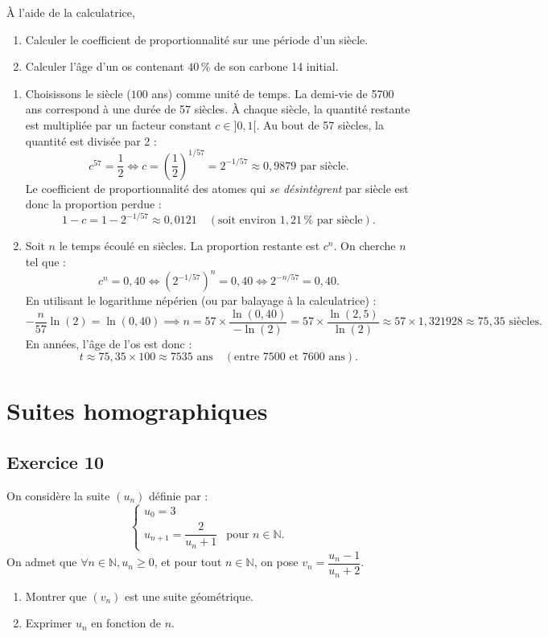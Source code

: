 \documentclass[11pt,a4paper]{article}
\newcommand{\N}{\mathbb{N}}
\begin{document}
À l'aide de la calculatrice,
\begin{enumerate}
    \item Calculer le coefficient de proportionnalité sur une période d'un siècle.
    \item Calculer l'âge d'un os contenant $40\,\%$ de son carbone 14 initial.
\end{enumerate}

\begin{correctionbox}
\begin{enumerate}
    \item Choisissons le siècle ($100$ ans) comme unité de temps. La demi-vie de 5700 ans correspond à une durée de 57 siècles.
    À chaque siècle, la quantité restante est multipliée par un facteur constant $c \in ]0, 1[$. Au bout de 57 siècles, la quantité est divisée par 2 :
    \[
    c^{57} = \frac{1}{2} \iff c = \left(\frac{1}{2}\right)^{1/57} = 2^{-1/57} \approx 0{,}9879 \text{ par siècle}.
    \]
    Le coefficient de proportionnalité des atomes qui \emph{se désintègrent} par siècle est donc la proportion perdue :
    \[
    1 - c = 1 - 2^{-1/57} \approx 0{,}0121 \quad (\text{soit environ } 1{,}21\,\% \text{ par siècle}).
    \]
    \item Soit $n$ le temps écoulé en siècles. La proportion restante est $c^n$. On cherche $n$ tel que :
    \[
    c^n = 0{,}40 \iff \left(2^{-1/57}\right)^n = 0{,}40 \iff 2^{-n/57} = 0{,}40.
    \]
    En utilisant le logarithme népérien (ou par balayage à la calculatrice) :
    \[
    -\frac{n}{57} \ln(2) = \ln(0{,}40) \implies n = 57 \times \frac{\ln(0{,}40)}{-\ln(2)} = 57 \times \frac{\ln(2{,}5)}{\ln(2)} \approx 57 \times 1{,}321928 \approx 75{,}35\text{ siècles}.
    \]
    En années, l'âge de l'os est donc :
    \[
    t \approx 75{,}35 \times 100 \approx 7535\text{~ans} \quad (\text{entre 7500 et 7600 ans}).
    \]
\end{enumerate}
\end{correctionbox}


\section{Suites homographiques}

\subsection*{Exercice 10}
On considère la suite $(u_n)$ définie par :
\[
\begin{cases}
u_0 = 3\\
u_{n+1} = \dfrac{2}{u_n + 1} & \text{pour } n \in \N.
\end{cases}
\]
On admet que $\forall n \in \N, u_n \ge 0$, et pour tout $n \in \N$, on pose $v_n = \dfrac{u_n - 1}{u_n + 2}$.
\begin{enumerate}
    \item Montrer que $(v_n)$ est une suite géométrique.
    \item Exprimer $u_n$ en fonction de $n$.
\end{enumerate}
\end{document}
